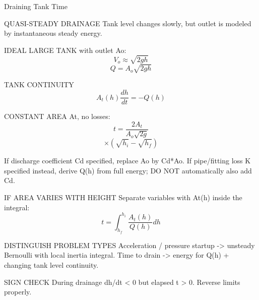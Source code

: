 Draining Tank Time

QUASI-STEADY DRAINAGE
Tank level changes slowly, but outlet is modeled by instantaneous steady energy.

IDEAL LARGE TANK with outlet Ao:
$$V_o\approx\sqrt{2gh}$$
$$Q=A_o\sqrt{2gh}$$

TANK CONTINUITY
$$A_t(h)\frac{dh}{dt}=-Q(h)$$

CONSTANT AREA At, no losses:
$$t=\frac{2A_t}{A_o\sqrt{2g}}$$
$$\times(\sqrt{h_i}-\sqrt{h_f})$$

If discharge coefficient Cd specified, replace Ao by Cd*Ao.
If pipe/fitting loss K specified instead, derive Q(h) from full energy; DO NOT automatically also add Cd.

IF AREA VARIES WITH HEIGHT
Separate variables with At(h) inside the integral:
$$t=\int_{h_f}^{h_i}\frac{A_t(h)}{Q(h)}dh$$

DISTINGUISH PROBLEM TYPES
Acceleration / pressure startup -> unsteady Bernoulli with local inertia integral.
Time to drain -> energy for Q(h) + changing tank level continuity.

SIGN CHECK
During drainage dh/dt < 0 but elapsed t > 0. Reverse limits properly.
